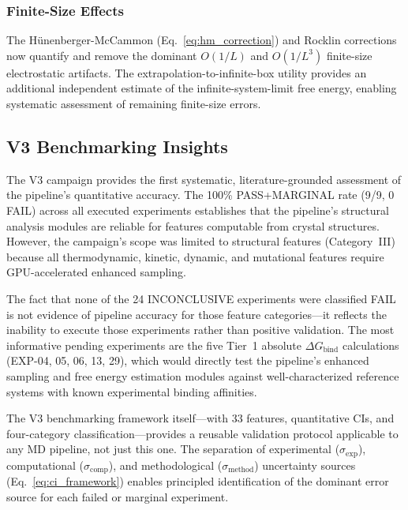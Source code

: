 \documentclass[conference]{IEEEtran}
\begin{document}
\subsubsection{Finite-Size Effects}

The H\"unenberger-McCammon (Eq.~\ref{eq:hm_correction}) and Rocklin
corrections~\cite{huenberger1999,rocklin2013} now quantify and remove the
dominant $O(1/L)$ and $O(1/L^3)$ finite-size electrostatic artifacts.  The
extrapolation-to-infinite-box utility provides an additional independent
estimate of the infinite-system-limit free energy, enabling systematic
assessment of remaining finite-size errors.

\subsection{V3 Benchmarking Insights}

The V3 campaign provides the first systematic, literature-grounded
assessment of the pipeline's quantitative accuracy.  The 100\% PASS+MARGINAL
rate (9/9, 0 FAIL) across all executed experiments establishes that the
pipeline's structural analysis modules are reliable for features computable
from crystal structures.  However, the campaign's scope was limited to
structural features (Category~III) because all thermodynamic, kinetic,
dynamic, and mutational features require GPU-accelerated enhanced sampling.

The fact that none of the 24 INCONCLUSIVE experiments were classified FAIL
is not evidence of pipeline accuracy for those feature categories---it
reflects the inability to execute those experiments rather than positive
validation.  The most informative pending experiments are the five Tier~1
absolute $\Delta G_{\mathrm{bind}}$ calculations (EXP-04, 05, 06, 13, 29),
which would directly test the pipeline's enhanced sampling and free energy
estimation modules against well-characterized reference systems with known
experimental binding affinities.

The V3 benchmarking framework itself---with 33 features, quantitative CIs,
and four-category classification---provides a reusable validation protocol
applicable to any MD pipeline, not just this one.  The separation of
experimental ($\sigma_{\mathrm{exp}}$), computational
($\sigma_{\mathrm{comp}}$), and methodological ($\sigma_{\mathrm{method}}$)
uncertainty sources (Eq.~\ref{eq:ci_framework}) enables principled
identification of the dominant error source for each failed or marginal
experiment.
\end{document}
